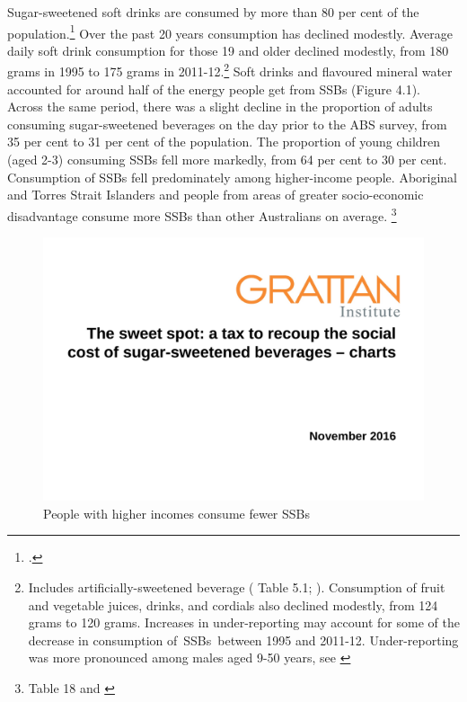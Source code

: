 \documentclass[embargoed]{grattan}
\begin{document}
Sugar-sweetened soft drinks are consumed by more than 80 per cent of the population.\footcite{Levy2014QuenchingAustraliasthirst} Over the past 20 years consumption has declined modestly. Average daily soft drink consumption for those 19 and older declined modestly, from 180 grams in 1995 to 175 grams in 2011-12.\footnote{Includes artificially-sweetened beverage (\textcite{ABS20144364055007AustralianHealth} Table 5.1; \textcite[][Table~1]{ABS199948040NationalNutrition}). Consumption of fruit and vegetable juices, drinks, and cordials also declined modestly, from 124 grams to 120 grams. Increases in under-reporting may account for some of the decrease in consumption of~SSBs~between 1995 and 2011-12. Under-reporting was more pronounced among males aged 9-50 years, see \textcite{ABS20144364055007AustralianHealth}} %
\CenturyFootnote
Soft drinks and flavoured mineral water accounted for around half of the energy people get from SSBs (Figure 4.1).
Across the same period, there was a slight decline in the proportion of adults consuming sugar-sweetened beverages on the day prior to the ABS survey, from 35 per cent to 31 per cent of the population.
The proportion of young children (aged 2-3) consuming SSBs fell more markedly, from 64 per cent to 30 per cent.
Consumption of SSBs fell predominately among higher-income people.
Aboriginal and Torres Strait Islanders and people from areas of greater socio-economic disadvantage consume more SSBs than other Australians on average.%
\footnote{\textcite{ABS20144364055007AustralianHealth} Table 18 and \textcite{ABS199948040NationalNutrition}}

\begin{figure}
\caption{People with higher incomes consume fewer SSBs}

\includegraphics[page=8]{atlas/ObesityCharts}


\end{figure}
\end{document}
